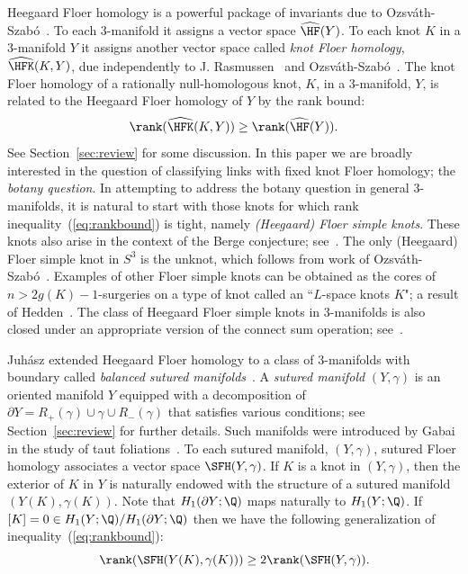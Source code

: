\documentclass{amsart}
\theoremstyle{definition}
\theoremstyle{remark}
\numberwithin{equation}{section}
\begin{document}
Heegaard Floer homology is a powerful package of invariants due to Ozsv\'ath-Szab\'o~\cite{ozsvath2004holomorphic}. To each $3$-manifold it assigns a vector space $\widehat{\HF}(Y)$. To each knot $K$ in a $3$-manifold $Y$ it assigns another vector space called \emph{knot Floer homology},  $\widehat{\HFK}(K,Y)$, due independently to J. Rasmussen~\cite{Rasmussen} and Ozsv\'ath-Szab\'o~\cite{Holomorphicdisksandknotinvariants}. The knot Floer homology of a rationally null-homologous knot, $K$, in a $3$-manifold, $Y$, is related to the Heegaard Floer homology of $Y$ by the rank bound:
\begin{equation}\label{eq:rankbound}
    \rank(\widehat{\HFK}(K,Y))\geq \rank(\widehat{\HF}(Y)).
\end{equation}
See Section~\ref{sec:review} for some discussion. In this paper we are broadly interested in the question of classifying links with fixed knot Floer homology; the \emph{botany question}. In attempting to address the botany question in general $3$-manifolds, it is natural to start with those knots for which rank inequality~(\ref{eq:rankbound}) is tight, namely \emph{(Heegaard) Floer simple knots}. These knots also arise in the context of the Berge conjecture; see~\cite{hedden2011floer}. The only (Heegaard) Floer simple knot in $S^3$ is the unknot, which follows from work of Ozsv\'ath-Szab\'o~\cite[Theorem 1.2]{ozsvath2004genusbounds}. Examples of other Floer simple knots can be obtained as the cores of $n>2g(K)-1$-surgeries on a type of knot called an ``$L$-space knots $K$"; a result of Hedden~\cite[Theorem 1.4]{hedden2011floer}. The class of Heegaard Floer simple knots in $3$-manifolds is also closed under an appropriate version of the connect sum operation; see~\cite{ni2014homological}.




Juh\'asz extended Heegaard Floer homology to a class of $3$-manifolds with boundary called \emph{balanced sutured manifolds}~\cite{juhasz2006holomorphic}. A \emph{sutured manifold} $(Y,\gamma)$ is an oriented manifold $Y$ equipped with a decomposition of $\partial Y=R_+(\gamma)\cup\gamma\cup R_-(\gamma)$ that satisfies various conditions; see Section~\ref{sec:review} for further details. Such manifolds were introduced by Gabai in the study of taut  foliations~\cite{gabai1983foliations}. To each sutured manifold, $(Y,\gamma)$, sutured Floer homology associates a vector space $\SFH(Y,\gamma)$. If $K$ is a knot in $(Y,\gamma)$, then the exterior of $K$ in $Y$ is naturally endowed with the structure of a sutured manifold $(Y(K),\gamma(K))$. Note that $H_1(\partial Y;\Q)$ maps naturally to $H_1(Y;\Q)$. If $[K]=0\in H_1(Y;\Q)/H_1(\partial Y;\Q)$ then we have the following generalization of inequality~(\ref{eq:rankbound}):
\begin{equation}\label{eq:rankbound2}
    \rank(\SFH(Y(K),\gamma(K)))\geq 2\rank(\SFH(Y,\gamma)).
\end{equation}
\end{document}
